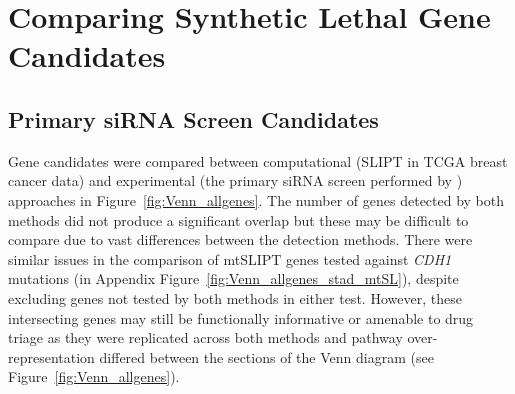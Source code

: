 

\FloatBarrier

\section{Comparing Synthetic Lethal Gene Candidates} \label{chapt3:compare_SL_genes}  



\subsection{Primary siRNA Screen Candidates} \label{chapt3:primary_screen}

Gene candidates were compared between computational (\gls{SLIPT} in TCGA breast cancer data) and experimental (the primary \gls{siRNA} screen performed by \citet{Telford2015}) approaches in Figure~\ref{fig:Venn_allgenes}. The number of genes detected by both methods did not produce a significant overlap but these may be difficult to compare due to vast differences between the detection methods. There were similar issues in the comparison of mtSLIPT genes tested against \textit{CDH1} mutations (in Appendix Figure~\ref{fig:Venn_allgenes_stad_mtSL}), despite excluding genes not tested by both methods in either test. However, these intersecting genes may still be functionally informative or amenable to drug triage as they were replicated across both methods and pathway over-represent\-ation differed between the sections of the Venn diagram (see Figure~\ref{fig:Venn_allgenes}).

